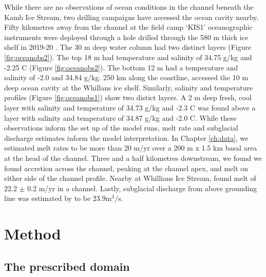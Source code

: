 While there are no observations of ocean conditions in the channel beneath the Kamb Ice Stream, two drilling campaigns have accessed the ocean cavity nearby. 
Fifty kilometres away from the channel at the field camp `KIS1' oceanographic instruments were deployed through a hole drilled through the 580 m thick ice shelf in 2019-20 \citep{robinson2020ice}. The 30 m deep water column had two distinct layers (Figure \ref{fig:oceanobs2}). The top 18 m had temperature and salinity of 34.75 g/kg and -2.25 \textdegree C (Figure \ref{fig:oceanobs2}). The bottom 12 m had a temperature and salinity of -2.0 and 34.84 g/kg.
250 km along the coastline, \cite{begeman2018ocean} accessed the 10 m deep ocean cavity at the Whillans ice shelf. Similarly, salinity and temperature profiles (Figure \ref{fig:oceanobs1}) show two distict layers. A 2 m deep fresh, cool layer with salinity and temperature of 34.73 g/kg and -2.3 \textdegree C was found above a layer with salinity and temperature of 34.87 g/kg and -2.0 \textdegree C.
While these observations inform the set up of the model runs, melt rate and subglacial discharge estimates inform the model interpretation.
In Chapter \ref{ch:data}, we estimated melt rates to be more than 20 m/yr over a 200 m x 1.5 km basal area at the head of the channel. Three and a half kilometres downstream, we found we found accretion across the channel, peaking at the channel apex, and melt on either side of the channel profile. Nearby at Whillians Ice Stream, \cite{marsh2016high} found melt of 22.2 $\pm$ 0.2 m/yr in a channel. Lastly, subglacial discharge from above grounding line was estimated by \cite{le2009subglacial} to be $23.9 \mathrm{m}^3/\mathrm{s}$.


\section{Method}

\subsection{The prescribed domain} \label{sec:domain}



